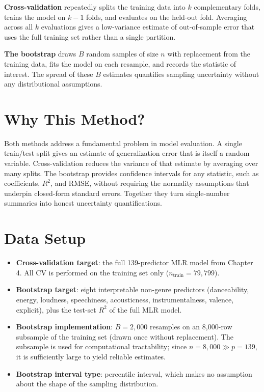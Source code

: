 \documentclass[12pt, oneside]{book}
\begin{document}
\textbf{Cross-validation} repeatedly splits the training data into $k$ complementary folds, trains the model on $k-1$ folds, and evaluates on the held-out fold. Averaging across all $k$ evaluations gives a low-variance estimate of out-of-sample error that uses the full training set rather than a single partition.
 
\textbf{The bootstrap} draws $B$ random samples of size $n$ with replacement from the training data, fits the model on each resample, and records the statistic of interest. The spread of these $B$ estimates quantifies sampling uncertainty without any distributional assumptions.
 
\section{Why This Method?}
 
Both methods address a fundamental problem in model evaluation. A single train/test split gives an estimate of generalization error that is itself a random variable. Cross-validation reduces the variance of that estimate by averaging over many splits. The bootstrap provides confidence intervals for any statistic, such as coefficients, $R^2$, and RMSE, without requiring the normality assumptions that underpin closed-form standard errors. Together they turn single-number summaries into honest uncertainty quantifications.
 
\section{Data Setup}
 
\begin{itemize}
    \item \textbf{Cross-validation target}: the full 139-predictor MLR model from Chapter 4. All CV is performed on the training set only ($n_{\text{train}} = 79{,}799$). 
    
    \item \textbf{Bootstrap target}: eight interpretable non-genre predictors (danceability, energy, loudness, speechiness, acousticness, instrumentalness, valence, explicit), plus the test-set $R^2$ of the full MLR model.
    \item \textbf{Bootstrap implementation}: $B = 2{,}000$ resamples on an 8{,}000-row subsample of the training set (drawn once without replacement). The subsample is used for computational tractability; since $n = 8{,}000 \gg p = 139$, it is sufficiently large to yield reliable estimates.
    \item \textbf{Bootstrap interval type}: percentile interval, which makes no assumption about the shape of the sampling distribution.
\end{itemize}
 
\end{document}
